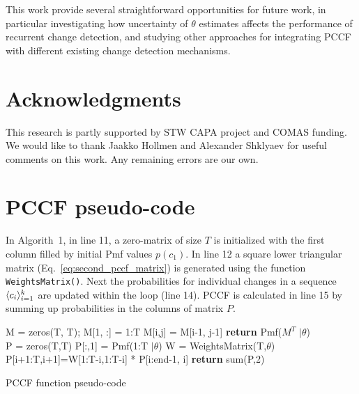 This work provide several straightforward opportunities for future work, in particular investigating how uncertainty of $\theta$ estimates affects the performance of recurrent change detection, and studying other approaches for integrating PCCF with different existing change detection mechanisms.

\section{Acknowledgments}
This research is partly supported by STW CAPA project and COMAS funding. We would like to thank Jaakko Hollmen and Alexander Shklyaev for useful comments on this work.
Any remaining errors are our own.

%
\section{PCCF pseudo-code}
\label{sec:pccf_pseudo_code}
In Algorith~1, in line 11,  a zero-matrix of size $T$ is initialized with the first column filled by initial Pmf values $p(c_1)$.
In line 12 a square lower triangular matrix (Eq.~\ref{eq:second_pccf_matrix}) is generated using the function {\tt WeightsMatrix()}.
Next the probabilities for individual changes in a sequence
$\langle  c_i  \rangle_{i=1}^k$
are updated within the loop (line 14).
PCCF is calculated in line 15 by summing up probabilities in the columns of matrix $P$.
\begin{algorithm}
    \label{alg:pccfalg}
\begin{algorithmic}[1]
    \State M = zeros(T, T);  M[1, :] = 1:T
			\State M[i,j] = M[i-1, j-1]
		\EndFor
	\EndFor
	\State \textbf{return} Pmf($M^T$ $| \theta$)
\EndFunction
\\
\State P = zeros(T,T)
\State P[:,1] = Pmf(1:T $| \theta$) 
\State W = WeightsMatrix(T,$\theta$)
	\State P[i+1:T,i+1]=W[1:T-i,1:T-i] * P[i:end-1, i]
\EndFor
\State \textbf{return} sum(P,2) 
\EndFunction
\end{algorithmic}
\caption{PCCF function pseudo-code}
\end{algorithm}

